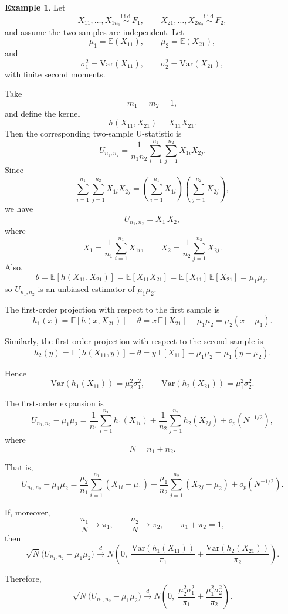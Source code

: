 \documentclass[11pt]{article}
\theoremstyle{definition}
\newtheorem{exmp}{Example}[section]
\begin{document}
\begin{exmp}
Let
\[
X_{11},\dots,X_{1n_1}\overset{\text{i.i.d.}}{\sim}F_1,
\qquad
X_{21},\dots,X_{2n_2}\overset{\text{i.i.d.}}{\sim}F_2,
\]
and assume the two samples are independent. Let
\[
\mu_1=\mathbb{E}(X_{11}),\qquad \mu_2=\mathbb{E}(X_{21}),
\]
and
\[
\sigma_1^2=\mathrm{Var}(X_{11}),\qquad \sigma_2^2=\mathrm{Var}(X_{21}),
\]
with finite second moments.

Take
\[
m_1=m_2=1,
\]
and define the kernel
\[
h(X_{11},X_{21})=X_{11}X_{21}.
\]
Then the corresponding two-sample U-statistic is
\[
U_{n_1,n_2}
=
\frac{1}{n_1n_2}\sum_{i=1}^{n_1}\sum_{j=1}^{n_2} X_{1i}X_{2j}.
\]
Since
\[
\sum_{i=1}^{n_1}\sum_{j=1}^{n_2} X_{1i}X_{2j}
=
\left(\sum_{i=1}^{n_1}X_{1i}\right)\left(\sum_{j=1}^{n_2}X_{2j}\right),
\]
we have
\[
U_{n_1,n_2}
=
\bar X_1\,\bar X_2,
\]
where
\[
\bar X_1=\frac{1}{n_1}\sum_{i=1}^{n_1}X_{1i},
\qquad
\bar X_2=\frac{1}{n_2}\sum_{j=1}^{n_2}X_{2j}.
\]
Also,
\[
\theta
=
\mathbb{E}[h(X_{11},X_{21})]
=
\mathbb{E}[X_{11}X_{21}]
=
\mathbb{E}[X_{11}]\,\mathbb{E}[X_{21}]
=
\mu_1\mu_2,
\]
so \(U_{n_1,n_2}\) is an unbiased estimator of \(\mu_1\mu_2\).

The first-order projection with respect to the first sample is
\[
h_1(x)
=
\mathbb{E}[h(x,X_{21})]-\theta
=
x\,\mathbb{E}[X_{21}]-\mu_1\mu_2
=
\mu_2(x-\mu_1).
\]

Similarly, the first-order projection with respect to the second sample is
\[
h_2(y)
=
\mathbb{E}[h(X_{11},y)]-\theta
=
y\,\mathbb{E}[X_{11}]-\mu_1\mu_2
=
\mu_1(y-\mu_2).
\]

Hence
\[
\mathrm{Var}(h_1(X_{11}))=\mu_2^2\sigma_1^2,
\qquad
\mathrm{Var}(h_2(X_{21}))=\mu_1^2\sigma_2^2.
\]

The first-order expansion is
\[
U_{n_1,n_2}-\mu_1\mu_2
=
\frac{1}{n_1}\sum_{i=1}^{n_1}h_1(X_{1i})
+
\frac{1}{n_2}\sum_{j=1}^{n_2}h_2(X_{2j})
+
o_p(N^{-1/2}),
\]
where
\[
N=n_1+n_2.
\]

That is,
\[
U_{n_1,n_2}-\mu_1\mu_2
=
\frac{\mu_2}{n_1}\sum_{i=1}^{n_1}(X_{1i}-\mu_1)
+
\frac{\mu_1}{n_2}\sum_{j=1}^{n_2}(X_{2j}-\mu_2)
+
o_p(N^{-1/2}).
\]

If, moreover,
\[
\frac{n_1}{N}\to \pi_1,\qquad \frac{n_2}{N}\to \pi_2,
\qquad \pi_1+\pi_2=1,
\]
then
\[
\sqrt{N}\bigl(U_{n_1,n_2}-\mu_1\mu_2\bigr)
\xrightarrow{d}
N\!\left(
0,\;
\frac{\mathrm{Var}(h_1(X_{11}))}{\pi_1}
+
\frac{\mathrm{Var}(h_2(X_{21}))}{\pi_2}
\right).
\]

Therefore,
\[
\sqrt{N}\bigl(U_{n_1,n_2}-\mu_1\mu_2\bigr)
\xrightarrow{d}
N\!\left(
0,\;
\frac{\mu_2^2\sigma_1^2}{\pi_1}
+
\frac{\mu_1^2\sigma_2^2}{\pi_2}
\right).
\]
\end{exmp}
\newpage
\end{document}
